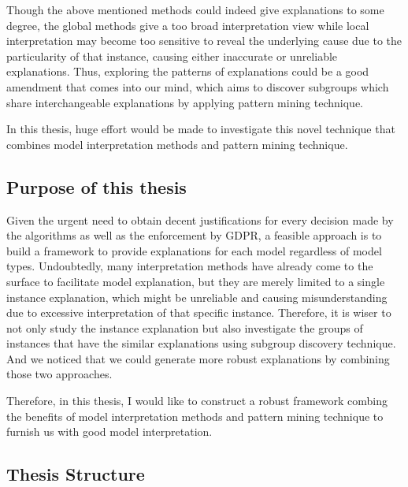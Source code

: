 Though the above mentioned methods could indeed give explanations to some degree, the global methods give a too broad interpretation view while local interpretation may become too sensitive to reveal the underlying cause due to the particularity of that instance, causing either inaccurate or unreliable explanations. Thus, exploring the patterns of explanations could be a good amendment that comes into our mind, which aims to discover subgroups which share interchangeable explanations by applying pattern mining technique. 

In this thesis, huge effort would be made to investigate this novel technique that combines model interpretation methods and pattern mining technique. 

\subsection{Purpose of this thesis}

Given the urgent need to obtain decent justifications for every decision made by the algorithms as well as the enforcement by GDPR, a feasible approach is to build a framework to provide explanations for each model regardless of model types. Undoubtedly, many interpretation methods have already come to the surface to facilitate model explanation, but they are merely limited to a single instance explanation, which might be unreliable and causing misunderstanding due to excessive interpretation of that specific instance. Therefore, it is wiser to not only study the instance explanation but also investigate the groups of instances that have the similar explanations using subgroup discovery technique. And we noticed that we could generate more robust explanations by combining those two approaches. 

Therefore, in this thesis, I would like to construct a robust framework combing the benefits of model interpretation methods and pattern mining technique to furnish us with good model interpretation. 


%
%	
%	
%	
%	
%	


\subsection{Thesis Structure}